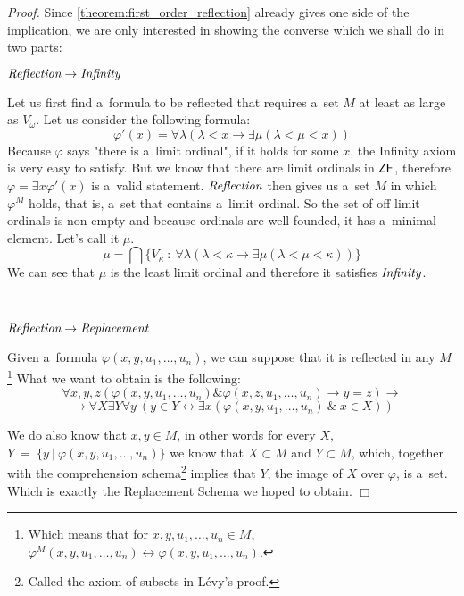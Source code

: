 \documentclass[12pt,a4paper]{article}
\newenvironment{proof}
{\noindent \textit{Proof.}}
{\hspace*{\fill} $\Box$}
\renewcommand{\iff}{\leftrightarrow}
\newcommand{\then}{\rightarrow}
\begin{document}
\begin{proof}
Since \ref{theorem:first_order_reflection} already gives one side of the implication, we are only interested in showing the converse which we shall do in two parts:

$\bold{\emph{Reflection} \then \emph{Infinity}}$

Let us first find a~formula to be reflected that requires a~set $M$ at least as large as $V_\omega$.
Let us consider the following formula:
\begin{equation}
\varphi'(x) = \forall \lambda(\lambda < x \then \exists \mu(\lambda < \mu < x))
\end{equation}
Because $\varphi$ says "there is a~limit ordinal", if it holds for some $x$, the Infinity axiom is very easy to satisfy. But we know that there are limit ordinals in $\sf{ZF}$, therefore $\varphi = \exists x \varphi'(x)$ is a~valid statement. $\emph{Reflection}$ then gives us a~set $M$ in which $\varphi^M$ holds, that is, a~set that contains a~limit ordinal. So the set of off limit ordinals is non-empty and because ordinals are well-founded, it has a~minimal element. Let's call it $\mu$.
\begin{equation}
\mu = \bigcap \{V_\kappa\ :\  \forall \lambda(\lambda < \kappa \then \exists \mu(\lambda < \mu < \kappa))\}
\end{equation}
We can see that $\mu$ is the least limit ordinal and therefore it satisfies $\emph{Infinity}$.

\

$\bold{\emph{Reflection} \then \emph{Replacement}}$

Given a~formula $\varphi(x, y, u_1, \ldots, u_n)$, we can suppose that it is reflected in any $M$ \footnote{Which means that for $x, y, u_1, \ldots, u_n \in M$, $\varphi^M(x, y, u_1, \ldots, u_n) \iff \varphi(x, y, u_1, \ldots, u_n)$.}
What we want to obtain is the following:
\begin{equation}
\forall x, y, z (\varphi(x, y, u_1, \ldots, u_n) \& \varphi(x, z, u_1, \ldots, u_n) \then y = z) \then
\end{equation}
\begin{equation}
\then \forall X \exists Y \forall y\ (y \in Y \iff \exists x (\varphi(x, y, u_1, \ldots, u_n)\ \&\ x \in X ))
\end{equation}

We do also know that $x, y \in M$, in other words for every $X$, $Y\ =\ \{y\ |\ \varphi(x, y, u_1, \ldots, u_n)\}$ we know that $X \subset M$ and $Y \subset M$, which, together with the comprehension schema\footnote{Called the axiom of subsets in Lévy's proof.} implies that $Y$, the image of $X$ over $\varphi$, is a~set.
Which is exactly the Replacement Schema we hoped to obtain.
\end{proof}
\end{document}
